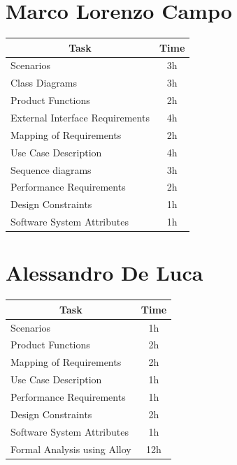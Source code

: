 \documentclass[12pt]{report}
\begin{document}
\section{Marco Lorenzo Campo}
\begin{table}[h]
\centering
\begin{tabular}{|l|c|}
\hline
\multicolumn{1}{|c|}{Task}      & Time                  \\ \hline
Scenarios                       & 3h                     \\ \hline
Class Diagrams                  & 3h                     \\ \hline
Product Functions               & 2h                     \\ \hline
External Interface Requirements & 4h                     \\ \hline
Mapping of Requirements         & 2h                     \\ \hline
Use Case Description            & 4h                     \\ \hline
Sequence diagrams               & 3h                     \\ \hline
Performance Requirements        & 2h                     \\ \hline
Design Constraints              & 1h                     \\ \hline
Software System Attributes      & 1h \\
\hline
\end{tabular}
\end{table}
\section{Alessandro De Luca}
\begin{table}[h]
\centering
\begin{tabular}{|l|c|}
\hline
\multicolumn{1}{|c|}{Task}      & Time \\ \hline
Scenarios                       & 1h    \\ \hline
Product Functions               & 2h    \\ \hline
Mapping of Requirements         & 2h    \\ \hline
Use Case Description            & 1h    \\ \hline
Performance Requirements        & 1h    \\ \hline
Design Constraints              & 2h    \\ \hline
Software System Attributes      & 1h    \\ \hline
Formal Analysis using Alloy     & 12h   \\ \hline
\end{tabular}
\end{table}
\end{document}
